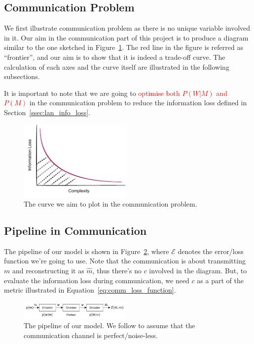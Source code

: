 \documentclass[11pt]{article}
\begin{document}
\subsection{Communication Problem}
\label{sec:comm}

We first illustrate communication problem as there is no unique variable involved in it.
Our aim in the communication part of this project is to produce a diagram similar to the one sketched in Figure~\ref{fig:curve_comm}.
The red line in the figure is referred as ``frontier'', and our aim is to show that it is indeed a trade-off curve.
The calculation of each axes and the curve itself are illustrated in the following subsections.

It is important to note that we are going to \textcolor{red}{optimise both $P(W|M)$ and $P(M)$} in the communication problem to reduce the information loss defined in Section~\ref{ssec:lan_info_loss}.

\begin{figure}[t]
    \centering
    \includegraphics[width=0.49\textwidth]{docs/intro_rate_distortion/graphs/communication_curve.pdf}
    \caption{The curve we aim to plot in the communication problem.}
    \label{fig:curve_comm}
\end{figure}

\subsection{Pipeline in Communication}
\label{ssec:comm_pipeline}

The pipeline of our model is shown in Figure~\ref{fig:pipeline}, where $\mathcal{E}$ denotes the error/loss function we're going to use.
Note that the communication is about transmitting $m$ and reconstructing it as $\hat{m}$, thus there's no $c$ involved in the diagram.
But, to evaluate the information loss during communication, we need $c$ as a part of the metric illustrated in Equation~\ref{eq:comm_loss_function}.

\begin{figure}[h]
    \centering
    \includegraphics[width=0.49\textwidth]{docs/intro_rate_distortion/graphs/cog_communication.pdf}
    \caption{The pipeline of our model. We follow \citet{zaslavsky2018efficient} to assume that the communication channel is perfect/noise-less.}
    \label{fig:pipeline}
\end{figure}
\end{document}
